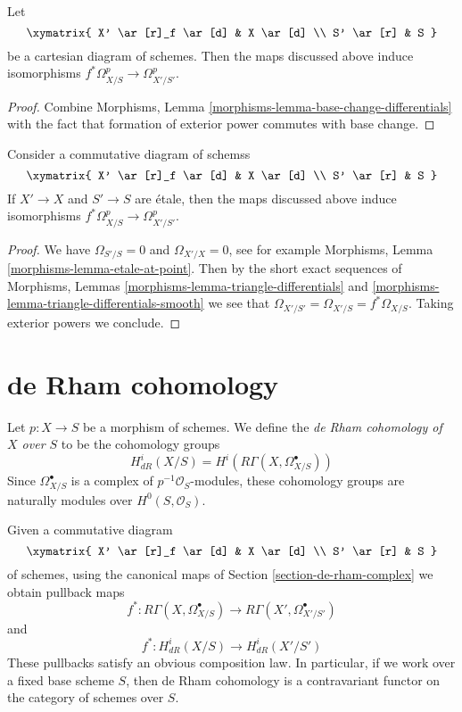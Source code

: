 \begin{lemma}
\label{lemma-base-change-de-rham}
Let
$$
\xymatrix{
X' \ar[r]_f \ar[d] & X \ar[d] \\
S' \ar[r] & S
}
$$
be a cartesian diagram of schemes. Then the maps discussed
above induce isomorphisms
$f^*\Omega^p_{X/S} \to \Omega^p_{X'/S'}$.
\end{lemma}

\begin{proof}
Combine Morphisms, Lemma \ref{morphisms-lemma-base-change-differentials}
with the fact that formation of exterior power commutes with base change.
\end{proof}

\begin{lemma}
\label{lemma-etale}
Consider a commutative diagram of schemss
$$
\xymatrix{
X' \ar[r]_f \ar[d] & X \ar[d] \\
S' \ar[r] & S
}
$$
If $X' \to X$ and $S' \to S$ are \'etale, then the maps discussed
above induce isomorphisms
$f^*\Omega^p_{X/S} \to \Omega^p_{X'/S'}$.
\end{lemma}

\begin{proof}
We have $\Omega_{S'/S} = 0$ and $\Omega_{X'/X} = 0$, see for example
Morphisms, Lemma \ref{morphisms-lemma-etale-at-point}. Then by
the short exact sequences of Morphisms, Lemmas
\ref{morphisms-lemma-triangle-differentials} and
\ref{morphisms-lemma-triangle-differentials-smooth}
we see that $\Omega_{X'/S'} = \Omega_{X'/S} = f^*\Omega_{X/S}$.
Taking exterior powers we conclude.
\end{proof}






\section{de Rham cohomology}
\label{section-de-rham-cohomology}

\noindent
Let $p : X \to S$ be a morphism of schemes. We define the
{\it de Rham cohomology of $X$ over $S$} to be the cohomology
groups
$$
H^i_{dR}(X/S) = H^i(R\Gamma(X, \Omega^\bullet_{X/S}))
$$
Since $\Omega^\bullet_{X/S}$ is a complex of $p^{-1}\mathcal{O}_S$-modules,
these cohomology groups are naturally modules over $H^0(S, \mathcal{O}_S)$.

\medskip\noindent
Given a commutative diagram
$$
\xymatrix{
X' \ar[r]_f \ar[d] & X \ar[d] \\
S' \ar[r] & S
}
$$
of schemes, using the canonical maps of Section \ref{section-de-rham-complex}
we obtain pullback maps
$$
f^* :
R\Gamma(X, \Omega^\bullet_{X/S})
\longrightarrow
R\Gamma(X', \Omega^\bullet_{X'/S'})
$$
and
$$
f^* : H^i_{dR}(X/S) \longrightarrow H^i_{dR}(X'/S')
$$
These pullbacks satisfy an obvious composition law.
In particular, if we work over a fixed base scheme $S$, then de Rham
cohomology is a contravariant functor on the category of schemes over $S$.

